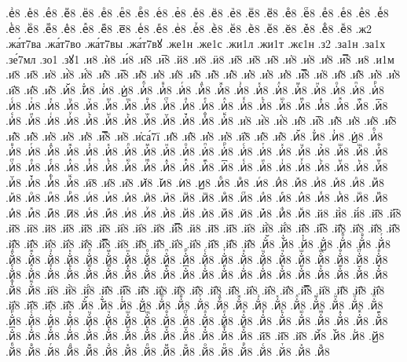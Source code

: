 {.еⷥ8
.еⷦ8
.еⷧ8
.еⷨ8
.еⷩ8
.еⷪ8
.еⷫ8
.еⷬ8
.еⷭ8
.еⷮ8
.еⷯ8
.еⷰ8
.еⷱ8
.еⷲ8
.еⷳ8
.еⷴ8
.еⷵ8
.еⷶ8
.еⷷ8
.еⷸ8
.еⷹ8
.еⷺ8
.еⷻ8
.еⷼ8
.еⷽ8
.еⷾ8
.еⷿ8
.е꙯8
.еꙴ8
.еꙵ8
.еꙶ8
.еꙷ8
.еꙸ8
.еꙹ8
.еꙺ8
.еꙻ8
.е꙼8
.е꙽8
.еꚞ8
.еꚟ8
.ж2
.жа́т7ва
.жа́т7во
.жа́т7вы
.жа́т7вꙋ
.же1н
.же1с
.жи1л
.жи1т
.жє1н
.з2
.за1н
.за1х
.зе́7мл
.зо1
.зꙋ1
.и8
.ѝ8
.и́8
.и̂8
.и̅8
.й8
.и̇8
.ӥ8
.и̋8
.и̏8
.и̑8
.и̓8
.и̔8
.и̾8
.и̿8
.и͘8
.и1м
.и҃8
.и҄8
.и҅8
.и҅̀8
.и҅́8
.и҅̂8
.и҅̅8
.и҅̆8
.и҅̇8
.и҅̈8
.и҅̋8
.и҅̏8
.и҅̑8
.и҅̓8
.и҅̔8
.и҅̾8
.и҅̿8
.и҅͘8
.и҅҃8
.и҅҄8
.и҅҅8
.и҅҆8
.и҅҇8
.и҅᷀8
.и҅᷁8
.и҅᷶8
.и᷷҅8
.и᷸҅8
.и᷹҅8
.и҅ⷠ8
.и҅ⷡ8
.и҅ⷢ8
.и҅ⷣ8
.и҅ⷤ8
.и҅ⷥ8
.и҅ⷦ8
.и҅ⷧ8
.и҅ⷨ8
.и҅ⷩ8
.и҅ⷪ8
.и҅ⷫ8
.и҅ⷬ8
.и҅ⷭ8
.и҅ⷮ8
.и҅ⷯ8
.и҅ⷰ8
.и҅ⷱ8
.и҅ⷲ8
.и҅ⷳ8
.и҅ⷴ8
.и҅ⷵ8
.и҅ⷶ8
.и҅ⷷ8
.и҅ⷸ8
.и҅ⷹ8
.и҅ⷺ8
.и҅ⷻ8
.и҅ⷼ8
.и҅ⷽ8
.и҅ⷾ8
.и҅ⷿ8
.и҅꙯8
.и҅ꙴ8
.и҅ꙵ8
.и҅ꙶ8
.и҅ꙷ8
.и҅ꙸ8
.и҅ꙹ8
.и҅ꙺ8
.и҅ꙻ8
.и҅꙼8
.и҅꙽8
.и҅ꚞ8
.и҅ꚟ8
.и҆8
.и҆̀8
.и҆́8
.и҆̂8
.и҆̅8
.и҆̆8
.и҆̇8
.и҆̈8
.и҆̋8
.и҆̏8
.и҆̑8
.и҆̓8
.и҆̔8
.и҆̾8
.и҆̿8
.и҆͘8
.и҆са́7ї
.и҆҃8
.и҆҄8
.и҆҅8
.и҆҆8
.и҆҇8
.и҆᷀8
.и҆᷁8
.и҆᷶8
.и᷷҆8
.и᷸҆8
.и᷹҆8
.и҆ⷠ8
.и҆ⷡ8
.и҆ⷢ8
.и҆ⷣ8
.и҆ⷤ8
.и҆ⷥ8
.и҆ⷦ8
.и҆ⷧ8
.и҆ⷨ8
.и҆ⷩ8
.и҆ⷪ8
.и҆ⷫ8
.и҆ⷬ8
.и҆ⷭ8
.и҆ⷮ8
.и҆ⷯ8
.и҆ⷰ8
.и҆ⷱ8
.и҆ⷲ8
.и҆ⷳ8
.и҆ⷴ8
.и҆ⷵ8
.и҆ⷶ8
.и҆ⷷ8
.и҆ⷸ8
.и҆ⷹ8
.и҆ⷺ8
.и҆ⷻ8
.и҆ⷼ8
.и҆ⷽ8
.и҆ⷾ8
.и҆ⷿ8
.и҆꙯8
.и҆ꙴ8
.и҆ꙵ8
.и҆ꙶ8
.и҆ꙷ8
.и҆ꙸ8
.и҆ꙹ8
.и҆ꙺ8
.и҆ꙻ8
.и҆꙼8
.и҆꙽8
.и҆ꚞ8
.и҆ꚟ8
.и҇8
.и᷀8
.и᷁8
.и᷶8
.и᷷8
.и᷸8
.и᷹8
.иⷠ8
.иⷡ8
.иⷢ8
.иⷣ8
.иⷤ8
.иⷥ8
.иⷦ8
.иⷧ8
.иⷨ8
.иⷩ8
.иⷪ8
.иⷫ8
.иⷬ8
.иⷭ8
.иⷮ8
.иⷯ8
.иⷰ8
.иⷱ8
.иⷲ8
.иⷳ8
.иⷴ8
.иⷵ8
.иⷶ8
.иⷷ8
.иⷸ8
.иⷹ8
.иⷺ8
.иⷻ8
.иⷼ8
.иⷽ8
.иⷾ8
.иⷿ8
.и꙯8
.иꙴ8
.иꙵ8
.иꙶ8
.иꙷ8
.иꙸ8
.иꙹ8
.иꙺ8
.иꙻ8
.и꙼8
.и꙽8
.иꚞ8
.иꚟ8
.й8
.й̀8
.й́8
.й̂8
.й̅8
.й̆8
.й̇8
.й̈8
.й̋8
.й̏8
.й̑8
.й̓8
.й̔8
.й̾8
.й̿8
.й͘8
.й҃8
.й҄8
.й҅8
.й҅̀8
.й҅́8
.й҅̂8
.й҅̅8
.й҅̆8
.й҅̇8
.й҅̈8
.й҅̋8
.й҅̏8
.й҅̑8
.й҅̓8
.й҅̔8
.й҅̾8
.й҅̿8
.й҅͘8
.й҅҃8
.й҅҄8
.й҅҅8
.й҅҆8
.й҅҇8
.й҅᷀8
.й҅᷁8
.й҅᷶8
.й᷷҅8
.й᷸҅8
.й᷹҅8
.й҅ⷠ8
.й҅ⷡ8
.й҅ⷢ8
.й҅ⷣ8
.й҅ⷤ8
.й҅ⷥ8
.й҅ⷦ8
.й҅ⷧ8
.й҅ⷨ8
.й҅ⷩ8
.й҅ⷪ8
.й҅ⷫ8
.й҅ⷬ8
.й҅ⷭ8
.й҅ⷮ8
.й҅ⷯ8
.й҅ⷰ8
.й҅ⷱ8
.й҅ⷲ8
.й҅ⷳ8
.й҅ⷴ8
.й҅ⷵ8
.й҅ⷶ8
.й҅ⷷ8
.й҅ⷸ8
.й҅ⷹ8
.й҅ⷺ8
.й҅ⷻ8
.й҅ⷼ8
.й҅ⷽ8
.й҅ⷾ8
.й҅ⷿ8
.й҅꙯8
.й҅ꙴ8
.й҅ꙵ8
.й҅ꙶ8
.й҅ꙷ8
.й҅ꙸ8
.й҅ꙹ8
.й҅ꙺ8
.й҅ꙻ8
.й҅꙼8
.й҅꙽8
.й҅ꚞ8
.й҅ꚟ8
.й҆8
.й҆̀8
.й҆́8
.й҆̂8
.й҆̅8
.й҆̆8
.й҆̇8
.й҆̈8
.й҆̋8
.й҆̏8
.й҆̑8
.й҆̓8
.й҆̔8
.й҆̾8
.й҆̿8
.й҆͘8
.й҆҃8
.й҆҄8
.й҆҅8
.й҆҆8
.й҆҇8
.й҆᷀8
.й҆᷁8
.й҆᷶8
.й᷷҆8
.й᷸҆8
.й᷹҆8
.й҆ⷠ8
.й҆ⷡ8
.й҆ⷢ8
.й҆ⷣ8
.й҆ⷤ8
.й҆ⷥ8
.й҆ⷦ8
.й҆ⷧ8
.й҆ⷨ8
.й҆ⷩ8
.й҆ⷪ8
.й҆ⷫ8
.й҆ⷬ8
.й҆ⷭ8
.й҆ⷮ8
.й҆ⷯ8
.й҆ⷰ8
.й҆ⷱ8
.й҆ⷲ8
.й҆ⷳ8
.й҆ⷴ8
.й҆ⷵ8
.й҆ⷶ8
.й҆ⷷ8
.й҆ⷸ8
.й҆ⷹ8
.й҆ⷺ8
.й҆ⷻ8
.й҆ⷼ8
.й҆ⷽ8
.й҆ⷾ8
.й҆ⷿ8
.й҆꙯8
.й҆ꙴ8
.й҆ꙵ8
.й҆ꙶ8
.й҆ꙷ8
.й҆ꙸ8
.й҆ꙹ8
.й҆ꙺ8
.й҆ꙻ8
.й҆꙼8
.й҆꙽8
.й҆ꚞ8
.й҆ꚟ8
.й҇8
.й᷀8
.й᷁8
.й᷶8
.й᷷8
.й᷸8
.й᷹8
.йⷠ8
.йⷡ8
.йⷢ8
.йⷣ8
.йⷤ8
.йⷥ8
.йⷦ8
.йⷧ8
.йⷨ8
.йⷩ8
.йⷪ8
.йⷫ8
.йⷬ8
.йⷭ8
.йⷮ8
.йⷯ8
.йⷰ8
}
